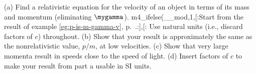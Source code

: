 (a) Find a relativistic equation for the velocity of an
object in terms of its mass and momentum (eliminating
$\mygamma$).
m4_ifelse(__mod,1,[:Start from the result of example \ref{eg:p-is-m-gamma-v}, p.~\pageref{eg:p-is-m-gamma-v}.:],[:%
Use natural units (i.e., discard factors of $c$) throughout.\answercheck\hwendpart
(b) Show that your result
is approximately the same as the nonrelativistic value, $p/m$, at
low velocities.\hwendpart
(c) Show that very large momenta result in
speeds close to the speed of light.\hwendpart
(d) Insert factors of $c$ to make your result from part a usable in SI units.\answercheck\hwendpart
